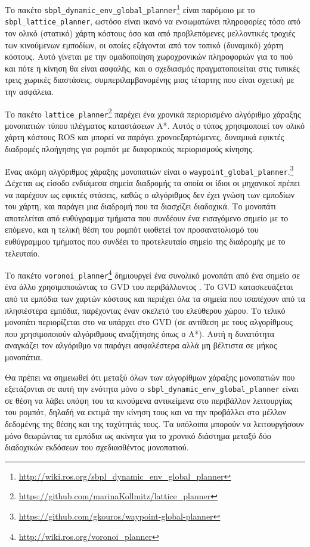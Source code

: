 Το πακέτο
\texttt{sbpl\_dynamic\_env\_global\_planner}\footnote{\url{http://wiki.ros.org/sbpl\_dynamic\_env\_global\_planner}\cite{Phillips2011}}
είναι παρόμοιο με το \texttt{sbpl\_lattice\_planner}, ωστόσο είναι ικανό να
ενσωματώνει πληροφορίες τόσο από τον ολικό (στατικό) χάρτη κόστους όσο και από
προβλεπόμενες μελλοντικές τροχιές των κινούμενων εμποδίων, οι οποίες εξάγονται
από τον τοπικό (δυναμικό) χάρτη κόστους. Αυτό γίνεται με την ομαδοποίηση
χωροχρονικών πληροφοριών για το πού και πότε η κίνηση θα είναι ασφαλής, και ο
σχεδιασμός πραγματοποιείται στις τυπικές τρεις χωρικές διαστάσεις,
συμπεριλαμβανομένης μιας τέταρτης που είναι σχετική με την ασφάλεια.

Το πακέτο
\texttt{lattice\_planner}\footnote{\url{https://github.com/marinaKollmitz/lattice\_planner}}
παρέχει ένα χρονικά περιορισμένο αλγόριθμο χάραξης μονοπατιών τύπου
πλέγματος καταστάσεων A*. Αυτός ο τύπος χρησιμοποιεί τον ολικό χάρτη κόστους
ROS και μπορεί να παράγει χρονοεξαρτώμενες, δυναμικά εφικτές διαδρομές
πλοήγησης για ρομπότ με διαφορικούς περιορισμούς κίνησης.

Ένας ακόμη αλγόριθμος χάραξης μονοπατιών είναι ο
\texttt{waypoint\_global\_planner}.\footnote{\url{https://github.com/gkouros/waypoint-global-planner}}
Δέχεται ως είσοδο ενδιάμεσα σημεία διαδρομής τα οποία οι ίδιοι οι μηχανικοί
πρέπει να παρέχουν ως εφικτές στάσεις, καθώς ο αλγόριθμος δεν έχει γνώση των
εμποδίων του χάρτη, και παράγει μια διαδρομή που τα διασχίζει διαδοχικά. Το
μονοπάτι αποτελείται από ευθύγραμμα τμήματα που συνδέουν ένα εισαγόμενο σημείο
με το επόμενο, και η τελική θέση του ρομπότ υιοθετεί τον προσανατολισμό του
ευθύγραμμου τμήματος που συνδέει το προτελευταίο σημείο της
διαδρομής με το τελευταίο.


Το πακέτο
\texttt{voronoi\_planner}\footnote{\url{http://wiki.ros.org/voronoi\_planner}}
δημιουργεί ένα συνολικό μονοπάτι από ένα σημείο σε ένα άλλο χρησιμοποιώντας το
GVD του περιβάλλοντος \cite{Bhattacharya2007}. Το GVD κατασκευάζεται από τα
εμπόδια των χαρτών κόστους και περιέχει όλα τα σημεία που ισαπέχουν από τα
πλησιέστερα εμπόδια, παρέχοντας έναν σκελετό του ελεύθερου χώρου. Το τελικό
μονοπάτι περιορίζεται στο να υπάρχει στο GVD (σε αντίθεση με τους αλγορίθμους
που χρησιμοποιούν αλγόριθμους αναζήτησης όπως ο A*). Αυτή η δυνατότητα
αναγκάζει τον αλγόριθμο να παράγει ασφαλέστερα αλλά μη βέλτιστα σε μήκος
μονοπάτια.

Θα πρέπει να σημειωθεί ότι μεταξύ όλων των αλγορίθμων χάραξης μονοπατιών που
εξετάζονται σε αυτή την ενότητα μόνο ο
\texttt{sbpl\_dynamic\_env\_global\_planner} είναι σε θέση να λάβει υπόψη του
τα κινούμενα αντικείμενα στο περιβάλλον λειτουργίας του ρομπότ, δηλαδή να
εκτιμά την κίνηση τους και να την προβάλλει στο μέλλον δεδομένης της θέσης και
της ταχύτητάς τους. Τα υπόλοιπα μπορούν να λειτουργήσουν μόνο θεωρώντας τα
εμπόδια ως ακίνητα για το χρονικό διάστημα μεταξύ δύο διαδοχικών εκδόσεων του
σχεδιασθέντος μονοπατιού.

